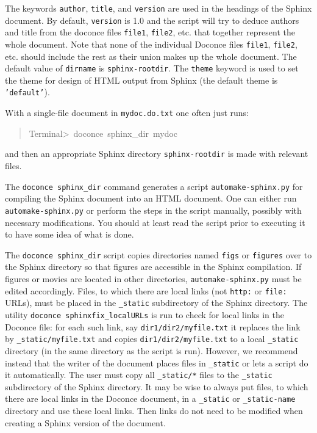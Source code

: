 \documentclass[a4paper]{article}
\begin{document}
The keywords \texttt{author}, \texttt{title}, and \texttt{version} are used in the headings
of the Sphinx document. By default, \texttt{version} is 1.0 and the script
will try to deduce authors and title from the doconce files \texttt{file1},
\texttt{file2}, etc. that together represent the whole document. Note that
none of the individual Doconce files \texttt{file1}, \texttt{file2}, etc. should
include the rest as their union makes up the whole document.
The default value of \texttt{dirname} is \texttt{sphinx-rootdir}. The \texttt{theme}
keyword is used to set the theme for design of HTML output from
Sphinx (the default theme is \texttt{'default'}).

With a single-file document in \texttt{mydoc.do.txt} one often just runs:
%
\begin{quote}{\ttfamily \raggedright \noindent
Terminal>~doconce~sphinx\_dir~mydoc
}
\end{quote}

and then an appropriate Sphinx directory \texttt{sphinx-rootdir} is made with
relevant files.

The \texttt{doconce sphinx\_dir} command generates a script
\texttt{automake-sphinx.py} for compiling the Sphinx document into an HTML
document.  One can either run \texttt{automake-sphinx.py} or perform the
steps in the script manually, possibly with necessary modifications.
You should at least read the script prior to executing it to have
some idea of what is done.

The \texttt{doconce sphinx\_dir} script copies directories named \texttt{figs} or
\texttt{figures} over to the Sphinx directory so that figures are accessible
in the Sphinx compilation.  If figures or movies are located in other
directories, \texttt{automake-sphinx.py} must be edited accordingly.  Files,
to which there are local links (not \texttt{http:} or \texttt{file:} URLs), must be
placed in the \texttt{\_static} subdirectory of the Sphinx directory. The
utility \texttt{doconce sphinxfix\_localURLs} is run to check for local links
in the Doconce file: for each such link, say \texttt{dir1/dir2/myfile.txt} it
replaces the link by \texttt{\_static/myfile.txt} and copies
\texttt{dir1/dir2/myfile.txt} to a local \texttt{\_static} directory (in the same
directory as the script is run).  However, we recommend instead that
the writer of the document places files in \texttt{\_static} or lets a script
do it automatically. The user must copy all \texttt{\_static/*} files to the
\texttt{\_static} subdirectory of the Sphinx directory.  It may be wise to
always put files, to which there are local links in the Doconce
document, in a \texttt{\_static} or \texttt{\_static-name} directory and use these
local links. Then links do not need to be modified when creating a
Sphinx version of the document.
\end{document}
